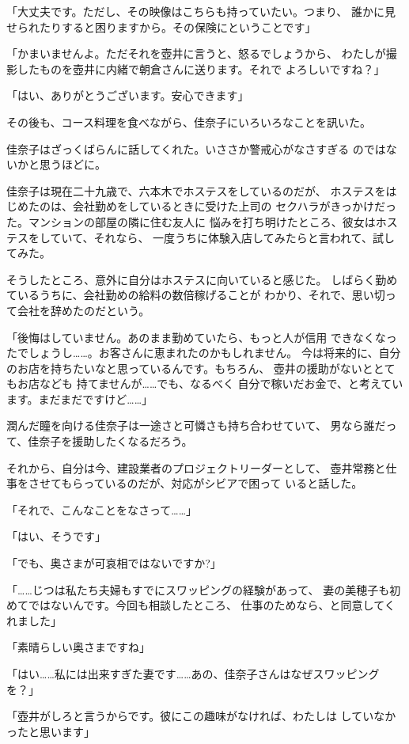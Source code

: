 ﻿\documentclass[
    book,tate,
    line_length=30zw,
    jafontsize=12pt,
    paper=b5j,
    landscape,
    ]{jlreq}
\begin{document}
「大丈夫です。ただし、その映像はこちらも持っていたい。つまり、
誰かに見せられたりすると困りますから。その保険にということです」

「かまいませんよ。ただそれを壺井に言うと、怒るでしょうから、
わたしが撮影したものを壺井に内緒で朝倉さんに送ります。それで
よろしいですね？」

「はい、ありがとうございます。安心できます」

その後も、コース料理を食べながら、佳奈子にいろいろなことを訊いた。

佳奈子はざっくばらんに話してくれた。いささか警戒心がなさすぎる
のではないかと思うほどに。

佳奈子は現在二十九歳で、六本木でホステスをしているのだが、
ホステスをはじめたのは、会社勤めをしているときに受けた上司の
セクハラがきっかけだった。マンションの部屋の隣に住む友人に
悩みを打ち明けたところ、彼女はホステスをしていて、それなら、
一度うちに体験入店してみたらと言われて、試してみた。

そうしたところ、意外に自分はホステスに向いていると感じた。
しばらく勤めているうちに、会社勤めの給料の数倍稼げることが
わかり、それで、思い切って会社を辞めたのだという。

「後悔はしていません。あのまま勤めていたら、もっと人が信用
できなくなったでしょうし……。お客さんに恵まれたのかもしれません。
今は将来的に、自分のお店を持ちたいなと思っているんです。もちろん、
壺井の援助がないととてもお店なども 持てませんが……でも、なるべく
自分で稼いだお金で、と考えています。まだまだですけど……」

潤んだ瞳を向ける佳奈子は一途さと可憐さも持ち合わせていて、
男なら誰だって、佳奈子を援助したくなるだろう。

それから、自分は今、建設業者のプロジェクトリーダーとして、
壺井常務と仕事をさせてもらっているのだが、対応がシビアで困って
いると話した。

「それで、こんなことをなさって……」

「はい、そうです」

「でも、奥さまが可哀相ではないですか?」

「……じつは私たち夫婦もすでにスワッピングの経験があって、
妻の美穂子も初めてではないんです。今回も相談したところ、
仕事のためなら、と同意してくれました」

「素晴らしい奥さまですね」

「はい……私には出来すぎた妻です……あの、佳奈子さんはなぜスワッピングを？」

「壺井がしろと言うからです。彼にこの趣味がなければ、わたしは
していなかったと思います」
\end{document}
